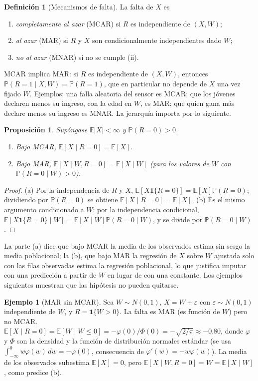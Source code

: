 \documentclass[11pt,a4paper]{article}
\theoremstyle{plain}
\newtheorem{proposicion}[teorema]{Proposición}
\theoremstyle{definition}
\newtheorem{definicion}[teorema]{Definición}
\newtheorem{ejemplo}[teorema]{Ejemplo}
\theoremstyle{remark}
\newcommand{\E}{\mathbb{E}}
\newcommand{\Prob}{\mathbb{P}}
\newcommand{\1}{\mathbf{1}}
\newcommand{\ind}[1]{\mathbf{1}\{#1\}}
\begin{document}
\begin{definicion}[Mecanismos de falta]\label{def:mcar}
La falta de $X$ es
\begin{enumerate}[label=(\roman*)]
\item \emph{completamente al azar} (MCAR) si $R$ es independiente de
$(X,W)$;
\item \emph{al azar} (MAR) si $R$ y $X$ son condicionalmente independientes
dado $W$;
\item \emph{no al azar} (MNAR) si no se cumple (ii).
\end{enumerate}
\end{definicion}

MCAR implica MAR: si $R$ es independiente de $(X,W)$, entonces
$\Prob(R=1\mid X,W)=\Prob(R=1)$, que en particular no depende de $X$ una
vez fijado $W$. Ejemplos: una falla aleatoria del sensor es MCAR; que los
jóvenes declaren menos su ingreso, con la edad en $W$, es MAR; que quien
gana más declare menos su ingreso es MNAR. La jerarquía importa por lo
siguiente.

\begin{proposicion}\label{prop:mcar}
Supóngase $\E|X|<\infty$ y $\Prob(R=0)>0$.
\begin{enumerate}[label=(\alph*)]
\item Bajo MCAR, $\E[X\mid R=0]=\E[X]$.
\item Bajo MAR, $\E[X\mid W,R=0]=\E[X\mid W]$ (para los valores de $W$ con
$\Prob(R=0\mid W)>0$).
\end{enumerate}
\end{proposicion}

\begin{proof}
(a) Por la independencia de $R$ y $X$,
$\E[X\ind{R=0}]=\E[X]\Prob(R=0)$; dividiendo por $\Prob(R=0)$ se obtiene
$\E[X\mid R=0]=\E[X]$. (b) Es el mismo argumento condicionado a $W$: por
la independencia condicional,
$\E[X\ind{R=0}\mid W]=\E[X\mid W]\Prob(R=0\mid W)$, y se divide por
$\Prob(R=0\mid W)$.
\end{proof}

La parte (a) dice que bajo MCAR la media de los observados estima sin
sesgo la media poblacional; la (b), que bajo MAR la regresión de $X$ sobre
$W$ ajustada solo con las filas observadas estima la regresión poblacional,
lo que justifica imputar con una predicción a partir de $W$ en lugar de con
una constante. Los ejemplos siguientes muestran que las hipótesis no pueden
quitarse.

\begin{ejemplo}[MAR sin MCAR]
Sea $W\sim N(0,1)$, $X=W+\varepsilon$ con $\varepsilon\sim N(0,1)$
independiente de $W$, y $R=\ind{W>0}$. La falta es MAR (es función de $W$)
pero no MCAR. $\E[X\mid R=0]=\E[W\mid W\le0]=-\varphi(0)/\Phi(0)=-\sqrt{2/\pi}\approx-0.80$,
donde $\varphi$ y $\Phi$ son la densidad y la función de distribución
normales estándar (se usa $\int_{-\infty}^0w\varphi(w)\,dw=-\varphi(0)$,
consecuencia de $\varphi'(w)=-w\varphi(w)$). La media de los observados
subestima $\E[X]=0$, pero $\E[X\mid W,R=0]=W=\E[X\mid W]$, como predice
(b).
\end{ejemplo}
\end{document}
